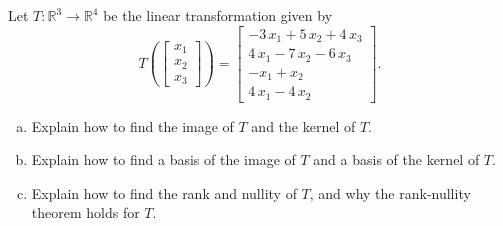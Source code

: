 
\begin{exerciseStatement}
 Let \(T:\mathbb{R}^ 3  \to \mathbb{R}^ 4 \) be the linear transformation given by \[T\left(  \left[\begin{array}{c}
x_{1} \\
x_{2} \\
x_{3}
\end{array}\right]  \right) =  \left[\begin{array}{c}
-3 \, x_{1} + 5 \, x_{2} + 4 \, x_{3} \\
4 \, x_{1} - 7 \, x_{2} - 6 \, x_{3} \\
-x_{1} + x_{2} \\
4 \, x_{1} - 4 \, x_{2}
\end{array}\right] .\]
\begin{enumerate}[(a)]
\item Explain how to find the image of \(T\) and the kernel of \(T\).
\item Explain how to find a basis of the image of \(T\) and a basis of the kernel of \(T\).
\item Explain how to find the rank and nullity of \(T\), and why the rank-nullity theorem holds for \(T\).
\end{enumerate}
    
\end{exerciseStatement}
    
